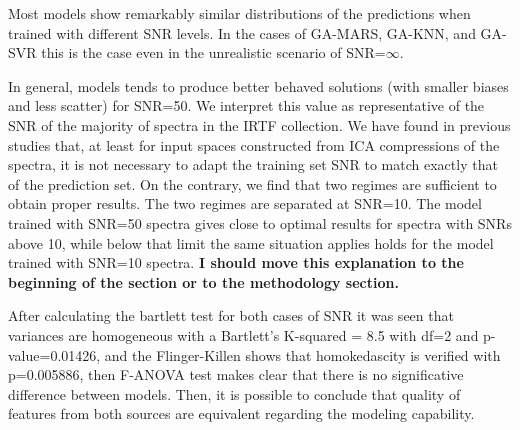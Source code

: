 Most models show remarkably similar distributions of the
predictions when trained with different SNR levels. In the cases of
GA-MARS, GA-KNN, and GA-SVR this is the case even in the unrealistic
scenario of SNR=$\infty$.

In general, models tends to produce better behaved solutions (with
smaller biases and less scatter) for SNR=50. We interpret this value
as representative of the SNR of the majority of spectra in the IRTF
collection. We have found in previous studies that, at least for input
spaces constructed from ICA compressions of the spectra, it is not
necessary to adapt the training set SNR to match exactly that of the
prediction set. On the contrary, we find that two regimes are
sufficient to obtain proper results. The two regimes are separated at
SNR=10. The model trained with SNR=50 spectra gives close to optimal
results for spectra with SNRs above 10, while below that limit the
same situation applies holds for the model trained with SNR=10
spectra. {\bf I should move this explanation to the beginning of the
section or to the methodology section.}

After calculating the bartlett test for both cases of SNR it was 
seen that variances are homogeneous with a Bartlett\textquoteright s K-squared = 8.5 with df=2
and p-value=0.01426, and 
the Flinger-Killen shows that homokedascity is verified with p=0.005886, 
then F-ANOVA test makes clear that there is no significative 
difference between models. Then, it is possible to conclude
that quality of features from both sources are equivalent
regarding the modeling capability.




